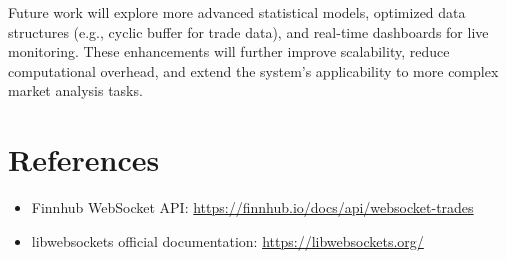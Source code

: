 \documentclass[11pt]{article}
\begin{document}
Future work will explore more advanced statistical models, optimized data structures (e.g., cyclic buffer for trade data), and real-time dashboards for live monitoring. These enhancements will further improve scalability, reduce computational overhead, and extend the system’s applicability to more complex market analysis tasks.

\section{References}

\begin{itemize}
  \item Finnhub WebSocket API: \url{https://finnhub.io/docs/api/websocket-trades}
  \item libwebsockets official documentation: \url{https://libwebsockets.org/}
\end{itemize}
\end{document}
